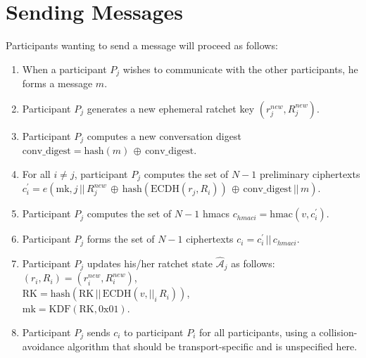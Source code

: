 \documentclass[%
preprint,
amsmath,amssymb,
aps,
prb,
floatfix,
]{revtex4-1}
\begin{document}
\section{\label{sec:sending}Sending Messages}
Participants wanting to send a message will proceed as follows:
\begin{enumerate}
\item When a participant $P_j$ wishes to communicate with the other
participants, he forms a message $m$.
\item Participant $P_j$ generates a new ephemeral ratchet key
$(r_j^{new},R_j^{new})$.
\item Participant $P_j$ computes a new conversation digest
$ \mathrm{conv\_digest} = \mathrm{hash}(m) \, \oplus \, \mathrm{conv\_digest}$.
\item For all $i \ne j$, participant $P_j$ computes the set of $N-1$ preliminary
ciphertexts $c_{i}^\prime = e(\mathrm{mk}, j
\, || \, R_j^{new} \, \oplus \, \mathrm{hash}(\mathrm{ECDH}(r_j, R_i)) \, \oplus
\, \mathrm{conv\_digest} \, || \, m)$.
\item Participant $P_j$ computes the set of $N-1$ hmacs $c_{hmaci} =
\mathrm{hmac}(v, c_i^\prime)$.
\item Participant $P_j$ forms the set of $N-1$ ciphertexts $c_i = c_i^\prime \, || \, c_{hmaci}$.
\item Participant $P_j$ updates his/her ratchet state $\mathcal{\hat{A}}_j$ as
follows:\\
$(r_i, R_i) = (r_i^{new}, R_i^{new})$, \\
$\mathrm{RK} = \mathrm{hash}(\mathrm{RK} \, || \, \mathrm{ECDH}(v, ||_i
\, R_i))$, \\
$\mathrm{mk} = \mathrm{KDF}(\mathrm{RK}, 0\mathrm{x}01)$.
\item Participant $P_j$ sends $c_i $ to participant $P_i$ for all participants,
using a collision-avoidance algorithm that should be transport-specific and is
unspecified here.
\end{enumerate}
\end{document}
